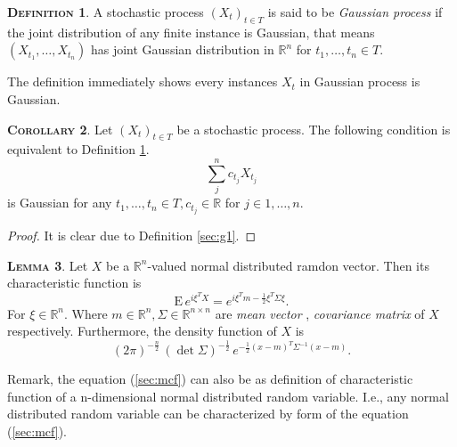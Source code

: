 \documentclass[a4paper, twoside, 11pt]{article}
\theoremstyle{definition}
\newtheorem{definition}{\scshape Definition}[section]
\newtheorem{lemma}[definition]{\scshape Lemma}
\newtheorem{corollary}[definition]{\scshape Corollary}
\begin{document}
\begin{definition}
  A stochastic process $(X_t)_{t\in T}$ is said to be \emph{Gaussian process} if the joint distribution of any finite instance is Gaussian, that means
$
(X_{t_1},\dots, X_{t_n})
$ has joint Gaussian distribution in $\mathbb{R}^n$ for $t_1,\dots,t_n \in T$.
\label{sec:defgau}
\end{definition}
The definition immediately shows every instances $X_t$ in Gaussian process is Gaussian.

\begin{corollary}
  Let $(X_t)_{t\in T}$ be a stochastic process. The following condition is equivalent to Definition \ref{sec:defgau}.
  \begin{equation}
	\sum_j^n c_{t_j} X_{t_j}
  \end{equation}
  is Gaussian for any $t_1,\dots,t_n \in T, c_{t_j} \in \mathbb{R}$ for $j\in {1,\dots,n}$.
  \label{sec:gauss}
\end{corollary}
\begin{proof}
  It is clear due to Definition \ref{sec:g1}.
\end{proof}

\begin{lemma}
  Let $X$ be a $\mathbb{R}^{n}$-valued normal distributed ramdon vector. Then its characteristic function is 
  \begin{equation}
	\mathrm{E}\,e^{i\xi^TX} = e^{i\xi^Tm - \frac{1}{2}\xi^T \Sigma \xi}.
	\label{sec:mcf}
  \end{equation}
 For $\xi \in \mathbb{R}^{n}$. Where $m \in \mathbb{R}^{n}, \Sigma \in \mathbb{R}^{n\times n}$ are \emph{mean vector} , \emph{covariance matrix} of $X$ respectively. Furthermore, the density function of $X$ is
\begin{equation}
  (2\pi)^{-\frac{n}{2}}\, (\det\Sigma) ^{-\frac{1}{2}}\,e^{-\frac{1}{2}(x-m)^T\Sigma^{-1}(x-m)}.
  \label{sec:dsy}
\end{equation}
\end{lemma}

Remark, the equation (\ref{sec:mcf}) can also be as definition of characteristic function of a n-dimensional normal distributed random variable. I.e., any normal distributed random variable can be characterized by form of the equation (\ref{sec:mcf}).
\end{document}
